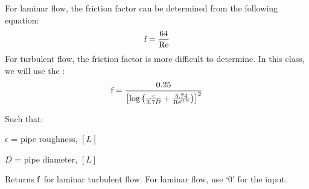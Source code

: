 \documentclass[letterpaper,10pt,english]{sphinxmanual}
\begin{document}
For laminar flow, the friction factor can be determined from the following equation:
\begin{equation}\label{equation:Fluids_Review/Fluids_Review_Design:Fluids_Review/Fluids_Review_Design:11}
\begin{split}{\rm{f}} = \frac{64}{\rm{Re}}\end{split}
\end{equation}
For turbulent flow, the friction factor is more difficult to determine. In this class, we will use the :
\begin{equation}\label{equation:Fluids_Review/Fluids_Review_Design:Fluids_Review/Fluids_Review_Design:12}
\begin{split}{\rm{f}} = \frac{0.25} {\left[ \log \left( \frac{\epsilon }{3.7D} + \frac{5.74}{{\rm Re}^{0.9}} \right) \right]^2}\end{split}
\end{equation}
\begin{DUlineblock}{0em}
\item[] Such that:
\item[] \(\epsilon\) = pipe roughness, \([L]\)
\item[] \(D\) = pipe diameter, \([L]\)
\end{DUlineblock}




  Returns \(\rm{f}\) for laminar  turbulent flow. For laminar flow, use ‘0’ for the  input.
\end{document}
